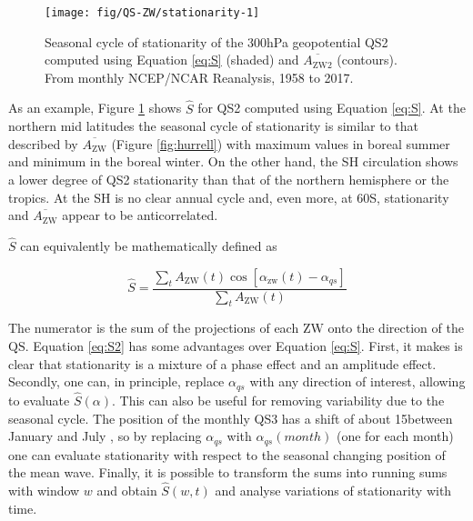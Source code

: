 \documentclass[draft,linenumbers]{agujournal2018}
\begin{document}
\begin{figure}[h]

{\centering \texttt{[image: fig/QS-ZW/stationarity-1]} 

}

\caption{Seasonal cycle of stationarity of the 300hPa geopotential QS2 computed using Equation \ref{eq:S} (shaded) and $\overline{A_\mathrm{ZW2}}$ (contours). From monthly NCEP/NCAR Reanalysis, 1958 to 2017.}\label{fig:stationarity}
\end{figure}

As an example, Figure \ref{fig:stationarity} shows \(\hat{S}\) for QS2
computed using Equation \ref{eq:S}. At the northern mid latitudes the
seasonal cycle of stationarity is similar to that described by
\(\overline{A_\mathrm{ZW}}\) (Figure \ref{fig:hurrell}) with maximum
values in boreal summer and minimum in the boreal winter. On the other
hand, the SH circulation shows a lower degree of QS2 stationarity than
that of the northern hemisphere or the tropics. At the SH is no clear
annual cycle and, even more, at 60\degree S, stationarity and
\(\overline{A_\mathrm{ZW}}\) appear to be anticorrelated.

\(\hat{S}\) can equivalently be mathematically defined as

\begin{linenomath*}
\begin{equation}\label{eq:S2}
\hat{S} =   \frac{\sum_t A_\mathrm{ZW}(t) \cos  \left [\alpha_\mathrm{zw}(t) - \alpha_{qs} \right ]}{\sum_t A_\mathrm{ZW}(t)}
\end{equation}
\end{linenomath*}

The numerator is the sum of the projections of each \(\mathrm{ZW}\) onto
the direction of the \(\mathrm{QS}\). Equation \ref{eq:S2} has some
advantages over Equation \ref{eq:S}. First, it makes is clear that
stationarity is a mixture of a phase effect and an amplitude effect.
Secondly, one can, in principle, replace \(\alpha_{qs}\) with any
direction of interest, allowing to evaluate \(\hat{S}(\alpha)\). This
can also be useful for removing variability due to the seasonal cycle.
The position of the monthly QS3 has a shift of about 15\degree between
January and July \citep{Loon1972}, so by replacing \(\alpha_{qs}\) with
\(\alpha_{qs}(month)\) (one for each month) one can evaluate
stationarity with respect to the seasonal changing position of the mean
wave. Finally, it is possible to transform the sums into running sums
with window \(w\) and obtain \(\hat{S}(w, t)\) and analyse variations of
stationarity with time.
\end{document}
